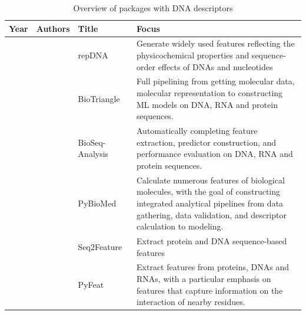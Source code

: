 \begin{table}[ht]
	\caption{Overview of packages with DNA descriptors}
	\label{tab:descriptors_DNA}
\centering
\begin{tabular}{lp{2cm}p{3.5cm}p{7cm}}
	\toprule
	\textbf{Year} & \textbf{Authors} & \textbf{Title} & \textbf{Focus}\\
	\midrule
	
	\citeyear{Liu2014RepDNA:Effects} & \citeauthor{Liu2014RepDNA:Effects} & repDNA~\cite{Liu2014RepDNA:Effects} & Generate widely used features reflecting the physicochemical properties and sequence-order effects of \gls{DNA}s and nucleotides \\\midrule
	
	\citeyear{Dong2016BioTriangle:Interactions} & \citeauthor{Dong2016BioTriangle:Interactions} & BioTriangle~\cite{Dong2016BioTriangle:Interactions} & Full pipelining from getting molecular data, molecular representation to constructing \gls{ML} models on \gls{DNA}, \gls{RNA} and protein sequences. \\\midrule
	
	\citeyear{Liu2017BioSeq-Analysis:Approaches} & \citeauthor{Liu2017BioSeq-Analysis:Approaches} & BioSeq-Analysis~\cite{Liu2017BioSeq-Analysis:Approaches} & Automatically completing feature extraction, predictor construction, and performance evaluation on \gls{DNA}, \gls{RNA} and protein sequences. \\\midrule
	
	\citeyear{Dong2018PyBioMed:Interactions} & \citeauthor{Dong2018PyBioMed:Interactions} & PyBioMed~\cite{Dong2018PyBioMed:Interactions} & Calculate numerous features of biological molecules, with the goal of constructing integrated analytical pipelines from data gathering, data validation, and descriptor calculation to modeling. \\\midrule
	
	\citeyear{Nikam2019Seq2Feature:Tool} & \citeauthor{Nikam2019Seq2Feature:Tool} & Seq2Feature~\cite{Nikam2019Seq2Feature:Tool} & Extract protein and \gls{DNA} sequence-based features \\\midrule
	
	\citeyear{Muhammod2019PyFeat:Sequences} & \citeauthor{Muhammod2019PyFeat:Sequences} & PyFeat~\cite{Muhammod2019PyFeat:Sequences} & Extract features from proteins, \gls{DNA}s and \gls{RNA}s, with a particular emphasis on features that capture information on the interaction of nearby residues. \\\midrule
	

\end{tabular}
\end{table}
